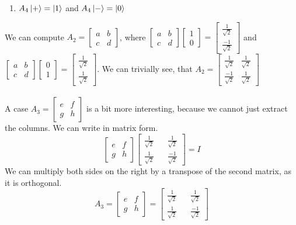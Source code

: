 \documentclass{article}
\begin{document}
\begin{framed}
\begin{enumerate}
        \item $A_4\ket{+} = \ket{1}$ and $A_4\ket{-} = \ket{0}$
    \end{enumerate}
    We can compute $A_2 = \begin{bmatrix} a & b \\ c & d \end{bmatrix}$, where $ \begin{bmatrix} a & b \\ c & d \end{bmatrix} \begin{bmatrix} 1 \\ 0 \end{bmatrix} = \begin{bmatrix} \frac{1}{\sqrt{2}} \\ \frac{-1}{\sqrt{2}} \end{bmatrix}$ and $ \begin{bmatrix} a & b \\ c & d \end{bmatrix} \begin{bmatrix} 0 \\ 1 \end{bmatrix} = \begin{bmatrix} \frac{1}{\sqrt{2}} \\ \frac{1}{\sqrt{2}} \end{bmatrix}$. We can trivially see, that $A_2 = \begin{bmatrix} \frac{1}{\sqrt{2}} & \frac{1}{\sqrt{2}} \\ \frac{-1}{\sqrt{2}} & \frac{1}{\sqrt{2}} \end{bmatrix}$ \\ \\ 
    A case $A_3 = \begin{bmatrix} e & f \\ g & h \end{bmatrix}$ is a bit more interesting, because we cannot just extract the columns. We can write in matrix form.
    $$
    \begin{bmatrix} e & f \\ g & h \end{bmatrix} \begin{bmatrix} \frac{1}{\sqrt{2}} && \frac{1}{\sqrt{2}} \\ \frac{1}{\sqrt{2}} && \frac{-1}{\sqrt{2}} \end{bmatrix} = I
    $$
    We can multiply both sides on the right by a transpose of the second matrix, as it is orthogonal.
    $$
    A_3 = \begin{bmatrix} e & f \\ g & h \end{bmatrix} = \begin{bmatrix} \frac{1}{\sqrt{2}} && \frac{1}{\sqrt{2}} \\ \frac{1}{\sqrt{2}} && \frac{-1}{\sqrt{2}} \end{bmatrix}
    $$
\end{framed}
\end{document}
